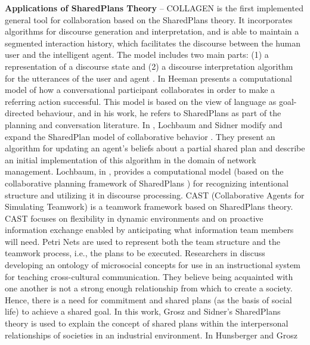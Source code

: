 \documentclass[12pt]{report}
\begin{document}
\textbf{Applications of SharedPlans Theory} -- COLLAGEN
\cite{rich:collaboration-manager, rich:discourse} is the first implemented
general tool for collaboration based on the SharedPlans theory. It incorporates
algorithms for discourse generation and interpretation, and is able to maintain
a segmented interaction history, which facilitates the discourse between the
human user and the intelligent agent. The model includes two main parts: (1) a
representation of a discourse state and (2) a discourse interpretation algorithm
for the utterances of the user and agent
\cite{rickel:discourse-theory-dialogue}. In
\cite{heeman:model-collaboration-referring} Heeman presents a computational
model of how a conversational participant collaborates in order to make a
referring action successful. This model is based on the view of language as
goal-directed behaviour, and in his work, he refers to SharedPlans as part of
the planning and conversation literature. In \cite{lochbaum:plan-models},
Lochbaum and Sidner modify and expand the SharedPlan model of collaborative
behavior \cite{grosz:plans-discourse}. They present an algorithm for updating an
agent's beliefs about a partial shared plan and describe an initial
implementation of this algorithm in the domain of network management. Lochbaum,
in \cite{lochbaum:collaborative-planning}, provides a computational model (based
on the collaborative planning framework of SharedPlans
\cite{grosz:collaboration}) for recognizing intentional structure and utilizing
it in discourse processing. CAST (Collaborative Agents for Simulating Teamwork)
\cite{yen:cast} \cite{yin:knowledge-based-sharedplans} is a teamwork framework
based on SharedPlans theory. CAST focuses on flexibility in dynamic environments
and on proactive information exchange enabled by anticipating what information
team members will need. Petri Nets are used to represent both the team structure
and the teamwork process, i.e., the plans to be executed. Researchers in
\cite{hobbs:microsociology-relationship} discuss developing an ontology of
microsocial concepts for use in an instructional system for teaching
cross-cultural communication. They believe being acquainted with one another is
not a strong enough relationship from which to create a society. Hence, there is
a need for commitment and shared plans (as the basis of social life) to achieve
a shared goal. In this work, Grosz and Sidner's SharedPlans theory
\cite{grosz:plans-discourse} is used to explain the concept of shared plans
within the interpersonal relationships of societies in an industrial
environment. In \cite{hunsberger:auction-collaborative} Hunsberger and Grosz
\end{document}

